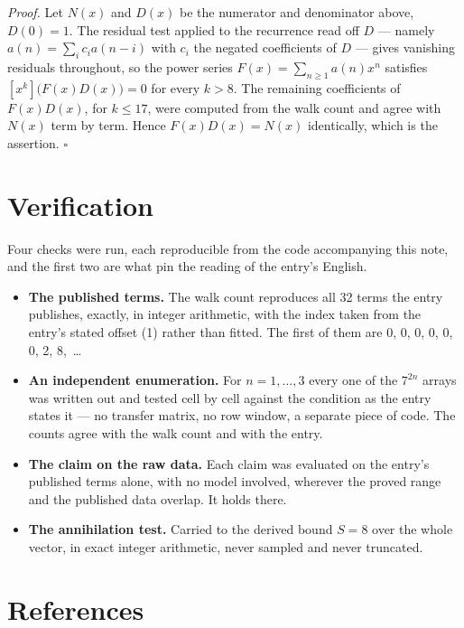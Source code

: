 \documentclass[11pt]{article}
\theoremstyle{definition}
\begin{document}
{\itshape Proof.} Let $N(x)$ and $D(x)$ be the numerator and denominator above, $D(0)=1$. The residual test applied to the recurrence read off $D$ --- namely $a(n) = \sum_i c_i a(n-i)$ with $c_i$ the negated coefficients of $D$ --- gives vanishing residuals throughout, so the power series $F(x)=\sum_{n\ge 1}a(n)x^n$ satisfies $[x^k]\bigl(F(x)D(x)\bigr) = 0$ for every $k > 8$. The remaining coefficients of $F(x)D(x)$, for $k \le 17$, were computed from the walk count and agree with $N(x)$ term by term. Hence $F(x)D(x) = N(x)$ identically, which is the assertion. $\square$

\section{Verification}

Four checks were run, each reproducible from the code accompanying this note, and the first two are what pin the reading of the entry's English.

\begin{itemize}

\item {\bfseries The published terms.} The walk count reproduces all 32 terms the entry publishes, exactly, in integer arithmetic, with the index taken from the entry's stated offset (1) rather than fitted. The first of them are 0, 0, 0, 0, 0, 0, 2, 8,~\dots

\item {\bfseries An independent enumeration.} For $n = 1,\dots,3$ every one of the $7^{2n}$ arrays was written out and tested cell by cell against the condition as the entry states it --- no transfer matrix, no row window, a separate piece of code. The counts agree with the walk count and with the entry.

\item {\bfseries The claim on the raw data.} Each claim was evaluated on the entry's published terms alone, with no model involved, wherever the proved range and the published data overlap. It holds there.

\item {\bfseries The annihilation test.} Carried to the derived bound $S = 8$ over the whole vector, in exact integer arithmetic, never sampled and never truncated.

\end{itemize}

\section{References}
\end{document}
